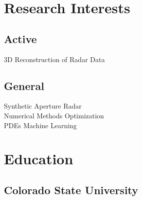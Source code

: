 \documentclass[letterpaper]{pine-resume} %
\begin{document}
\lastupdated %


\begin{minipage}[t]{0.33\textwidth} %

\section{Research Interests}

\subsection{Active}
3D Reconstruction of Radar Data \\

\subsection{General}
Synthetic Aperture Radar \\
Numerical Methods \textbullet{} Optimization \\
PDEs \textbullet{} Machine Learning

\sectionspace %


\section{Education}

\subsection{Colorado State University}


\end{minipage}
\end{document}
